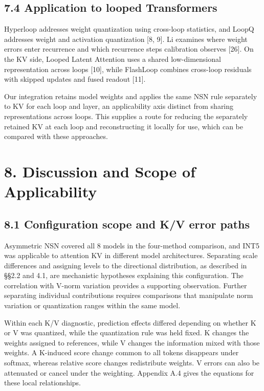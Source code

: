 \documentclass[10pt,a4paper]{article}
\begin{document}
\subsection{7.4 Application to looped Transformers}\label{application-to-looped-transformers}

Hyperloop addresses weight quantization using cross-loop statistics, and LoopQ addresses weight and activation quantization {[}8, 9{]}. Li examines where weight errors enter recurrence and which recurrence steps calibration observes {[}26{]}. On the KV side, Looped Latent Attention uses a shared low-dimensional representation across loops {[}10{]}, while FlashLoop combines cross-loop residuals with skipped updates and fused readout {[}11{]}.

Our integration retains model weights and applies the same NSN rule separately to KV for each loop and layer, an applicability axis distinct from sharing representations across loops. This supplies a route for reducing the separately retained KV at each loop and reconstructing it locally for use, which can be compared with these approaches.

\section{8. Discussion and Scope of Applicability}\label{discussion-and-scope-of-applicability}

\subsection{8.1 Configuration scope and K/V error paths}\label{configuration-scope-and-kv-error-paths}

Asymmetric NSN covered all 8 models in the four-method comparison, and INT5 was applicable to attention KV in different model architectures. Separating scale differences and assigning levels to the directional distribution, as described in §§2.2 and 4.1, are mechanistic hypotheses explaining this configuration. The correlation with V-norm variation provides a supporting observation. Further separating individual contributions requires comparisons that manipulate norm variation or quantization ranges within the same model.

Within each K/V diagnostic, prediction effects differed depending on whether K or V was quantized, while the quantization rule was held fixed. K changes the weights assigned to references, while V changes the information mixed with those weights. A K-induced score change common to all tokens disappears under softmax, whereas relative score changes redistribute weights. V errors can also be attenuated or cancel under the weighting. Appendix A.4 gives the equations for these local relationships.
\end{document}

